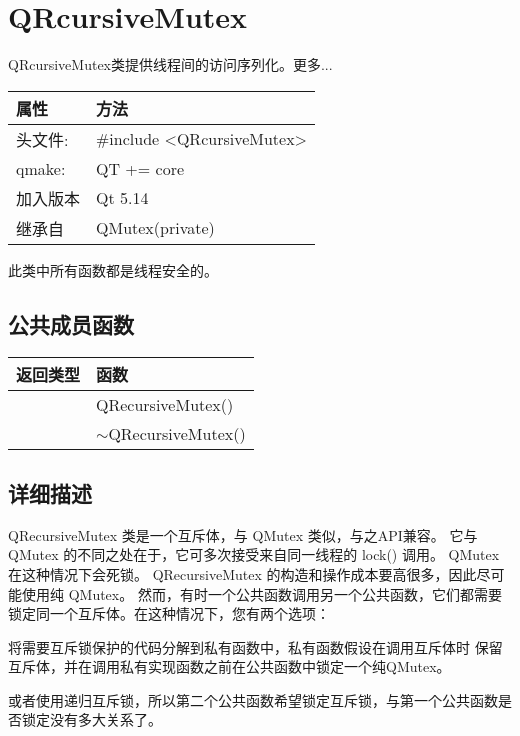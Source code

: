 \chapter{QRcursiveMutex}

QRcursiveMutex类提供线程间的访问序列化。更多...

\begin{tabular}{|l|l|}
\hline
属性 &	方法\\
\hline
头文件:& 	\#include <QRcursiveMutex>\\
\hline
qmake:& 	QT += core\\
\hline
加入版本 & 	Qt 5.14 \\ 
\hline
继承自 	& QMutex(private) \\ 
\hline
\end{tabular}

\begin{notice}
此类中所有函数都是线程安全的。
\end{notice}

\section{公共成员函数}

\begin{tabular}{|l|l|}
\hline
返回类型 &	函数 \\ 
\hline
& QRecursiveMutex() \\ 
\hline
& $\sim$QRecursiveMutex() \\ 
\hline
\end{tabular}

\section{详细描述}

QRecursiveMutex 类是一个互斥体，与 QMutex 类似，与之API兼容。
它与 QMutex 的不同之处在于，它可多次接受来自同一线程的 lock() 调用。
QMutex 在这种情况下会死锁。
QRecursiveMutex 的构造和操作成本要高很多，因此尽可能使用纯 QMutex。
然而，有时一个公共函数调用另一个公共函数，它们都需要锁定同一个互斥体。在这种情况下，您有两个选项：

\begin{compactitem}[\arr]
\item 将需要互斥锁保护的代码分解到私有函数中，私有函数假设在调用互斥体时 保留互斥体，并在调用私有实现函数之前在公共函数中锁定一个纯QMutex。
\item 或者使用递归互斥锁，所以第二个公共函数希望锁定互斥锁，与第一个公共函数是否锁定没有多大关系了。
\end{compactitem}

